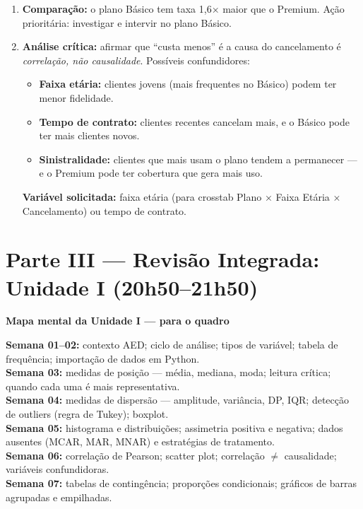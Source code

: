 \begin{SolvedBox}
\begin{enumerate}
  \item \textbf{Comparação:} o plano Básico tem taxa 1,6× maior que o
  Premium. Ação prioritária: investigar e intervir no plano Básico.
  
  \item \textbf{Análise crítica:} afirmar que ``custa menos'' é a causa do
  cancelamento é \emph{correlação, não causalidade}. Possíveis confundidores:
  \begin{itemize}
    \item \textbf{Faixa etária:} clientes jovens (mais frequentes no Básico)
    podem ter menor fidelidade.
    \item \textbf{Tempo de contrato:} clientes recentes cancelam mais, e o
    Básico pode ter mais clientes novos.
    \item \textbf{Sinistralidade:} clientes que mais usam o plano tendem a
    permanecer — e o Premium pode ter cobertura que gera mais uso.
  \end{itemize}
  \textbf{Variável solicitada:} faixa etária (para crosstab Plano × Faixa
  Etária × Cancelamento) ou tempo de contrato.
\end{enumerate}
\end{SolvedBox}

\section{Parte III — Revisão Integrada: Unidade I (20h50–21h50)}

\begin{SolvedBox}
\textbf{Mapa mental da Unidade I — para o quadro}

\textbf{Semana 01–02:} contexto AED; ciclo de análise; tipos de variável;
tabela de frequência; importação de dados em Python.\\
\textbf{Semana 03:} medidas de posição — média, mediana, moda;
leitura crítica; quando cada uma é mais representativa.\\
\textbf{Semana 04:} medidas de dispersão — amplitude, variância, DP, IQR;
detecção de outliers (regra de Tukey); boxplot.\\
\textbf{Semana 05:} histograma e distribuições; assimetria positiva e negativa;
dados ausentes (MCAR, MAR, MNAR) e estratégias de tratamento.\\
\textbf{Semana 06:} correlação de Pearson; scatter plot; correlação $\neq$ causalidade;
variáveis confundidoras.\\
\textbf{Semana 07:} tabelas de contingência; proporções condicionais;
gráficos de barras agrupadas e empilhadas.
\end{SolvedBox}

